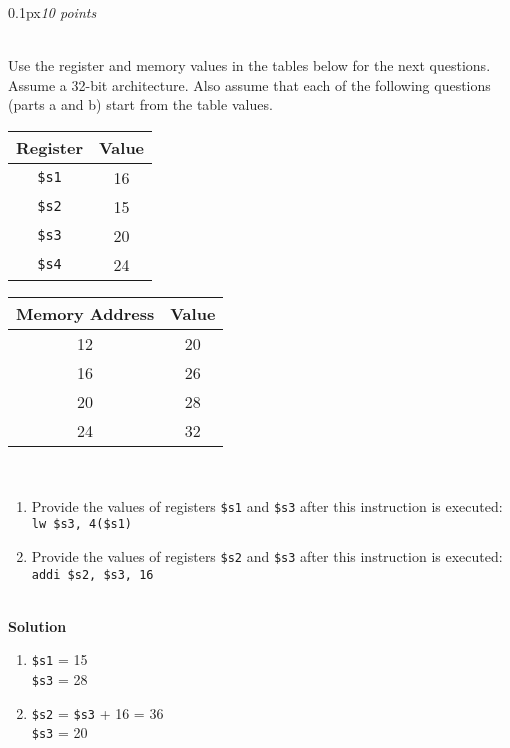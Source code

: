\documentclass[11pt]{article}
\newcommand{\problem}[2]{\begin{adjustwidth}{0.1px}\noindent \framebox[1.2\width]{\large Problem #1}\hfill \emph{#2} \end{adjustwidth} \bigskip\\}
\newcommand{\code}[1]{{\texttt{#1}}}
\begin{document}
\newpage
\problem{8}{10 points}
Use the register and memory values in the tables below for the next questions. Assume a 32-bit architecture. Also assume that each of the following questions (parts a and b) start from the table values.
\\
\begin{center}

\begin{tabular}{ |c|c| } 
\hline
Register & Value\\
\hline
\code{\$s1} & 16\\ 
\code{\$s2} & 15\\
\code{\$s3} & 20\\ 
\code{\$s4} & 24\\ 
\hline
\end{tabular}
\hspace{1cm}
\begin{tabular}{ |c|c| } 
\hline
Memory Address & Value\\
\hline
12 & 20\\ 
16 & 26\\
20 & 28\\ 
24 & 32\\ 
\hline
\end{tabular}
\end{center}
\medskip\\
\begin{enumerate}[label=(\alph*)]
    \item Provide the values of registers \code{\$s1} and \code{\$s3} after this instruction is executed:\\
    \code{lw \$s3, 4(\$s1)}

    \item Provide the values of registers \code{\$s2} and \code{\$s3} after this instruction is executed:\\
    \code{addi \$s2, \$s3, 16} 
\end{enumerate}
\bigskip \\
\textbf{Solution}
\begin{enumerate}[label=(\alph*)]
    \item \code{\$s1} = 15\\ \code{\$s3} = 28
    \item \code{\$s2} = \code{\$s3} + 16 = 36\\ \code{\$s3} = 20
\end{enumerate}
\end{document}
